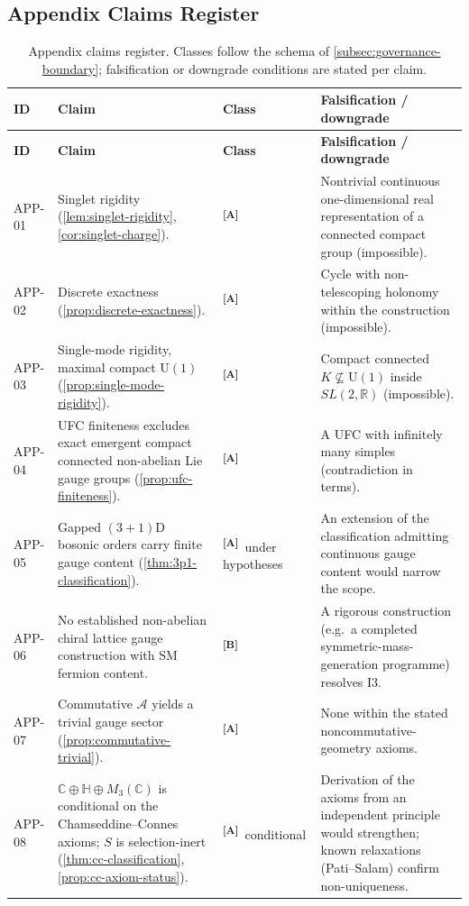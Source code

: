 \documentclass[12pt,a4paper,twoside]{article}
\theoremstyle{plain}
\theoremstyle{definition}
\theoremstyle{remark}
\newcommand{\catmark}[1]{\textsuperscript{\textsf{\textbf{[#1]}}}}
\begin{document}
\subsection{Appendix Claims Register}
\label{app:claims-register}

\begin{longtable}{p{} p{} p{} p{}}
\caption{Appendix claims register. Classes follow the schema of \cref{subsec:governance-boundary}; falsification or downgrade conditions are stated per claim.}\\
\toprule
\textbf{ID} & \textbf{Claim} & \textbf{Class} & \textbf{Falsification / downgrade} \\
\midrule
\endfirsthead
\toprule
\textbf{ID} & \textbf{Claim} & \textbf{Class} & \textbf{Falsification / downgrade} \\
\midrule
\endhead
APP-01 & Singlet rigidity (\cref{lem:singlet-rigidity}, \cref{cor:singlet-charge}). & \catmark{A} & Nontrivial continuous one-dimensional real representation of a connected compact group (impossible). \\
APP-02 & Discrete exactness (\cref{prop:discrete-exactness}). & \catmark{A} & Cycle with non-telescoping holonomy within the construction (impossible). \\
APP-03 & Single-mode rigidity, maximal compact $\mathrm{U}(1)$ (\cref{prop:single-mode-rigidity}). & \catmark{A} & Compact connected $K\not\subseteq\mathrm{U}(1)$ inside $SL(2,\mathbb{R})$ (impossible). \\
APP-04 & UFC finiteness excludes exact emergent compact connected non-abelian Lie gauge groups (\cref{prop:ufc-finiteness}). & \catmark{A} & A UFC with infinitely many simples (contradiction in terms). \\
APP-05 & Gapped $(3{+}1)$D bosonic orders carry finite gauge content (\cref{thm:3p1-classification}). & \catmark{A}\ under hypotheses & An extension of the classification admitting continuous gauge content would narrow the scope. \\
APP-06 & No established non-abelian chiral lattice gauge construction with SM fermion content. & \catmark{B} & A rigorous construction (e.g.\ a completed symmetric-mass-generation programme) resolves I3. \\
APP-07 & Commutative $\mathcal{A}$ yields a trivial gauge sector (\cref{prop:commutative-trivial}). & \catmark{A} & None within the stated noncommutative-geometry axioms. \\
APP-08 & $\mathbb{C}\oplus\mathbb{H}\oplus M_3(\mathbb{C})$ is conditional on the Chamseddine--Connes axioms; $S$ is selection-inert (\cref{thm:cc-classification}, \cref{prop:cc-axiom-status}). & \catmark{A}\ conditional & Derivation of the axioms from an independent principle would strengthen; known relaxations (Pati--Salam) confirm non-uniqueness. \\

\end{longtable}
\end{document}
